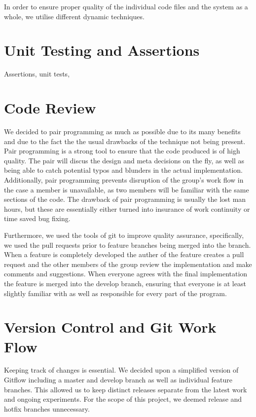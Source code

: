 In order to ensure proper quality of the individual code files and the system as a whole, we utilise different dynamic techniques.

\section{Unit Testing and Assertions}
Assertions, unit tests, 

\section{Code Review}
We decided to pair programming as much as possible due to its many benefits and due to the fact the the usual drawbacks of the technique not being present.
Pair programming is a strong tool to ensure that the code produced is of high quality. The pair will discus the design and meta decisions on the fly, as well as being able to catch potential typos and blunders in the actual implementation. Additionally, pair programming prevents disruption of the group's work flow in the case a member is unavailable, as two members will be familiar with the same sections of the code. The drawback of pair programming is usually the lost man hours, but these are essentially either turned into insurance of work continuity or time saved bug fixing.

Furthermore, we used the tools of git to improve quality assurance, specifically, we used the pull requests prior to feature branches being merged into the  branch. When a feature is completely developed the auther of the feature creates a pull request and the other members of the group review the implementation and make comments and suggestions. When everyone agrees with the final implementation the feature is merged into the develop branch, ensuring that everyone is at least slightly familiar with as well as responsible for every part of the program.

\section{Version Control and Git Work Flow}
Keeping track of changes is essential. We decided upon a simplified version of Gitflow including a master and develop branch as well as individual feature branches. This allowed us to keep distinct releases separate from the latest work and ongoing experiments. For the scope of this project, we deemed release and hotfix branches unnecessary.
